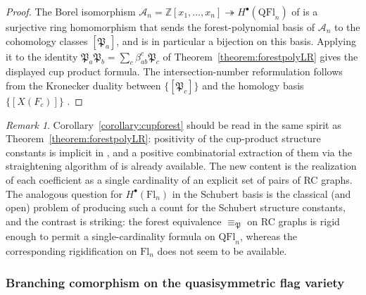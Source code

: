 \documentclass{amsart}
\theoremstyle{definition}
\theoremstyle{remark}
\newtheorem*{remark}{Remark}
\numberwithin{equation}{subsection}
\newcommand{\coma}{\mathcal{A}}
\newcommand{\forest}{\mathfrak{P}}
\begin{document}
\begin{proof}
The Borel isomorphism $\coma_n=\mathbb{Z}[x_1,\ldots,x_n]\twoheadrightarrow H^\bullet(\mathrm{QFl}_n)$ of \cite[Theorem~A and Corollary~12.5]{bergeron2025qsymflag} is a surjective ring homomorphism that sends the forest-polynomial basis of $\coma_n$ to the cohomology classes $[\forest_a]$, and is in particular a bijection on this basis. Applying it to the identity $\forest_a\forest_b = \sum_c \beta_{ab}^c \forest_c$ of Theorem~\ref{theorem:forestpolyLR} gives the displayed cup product formula. The intersection-number reformulation follows from the Kronecker duality between $\{[\forest_c]\}$ and the homology basis $\{[X(F_c)]\}$ \cite[Theorem~12.12]{bergeron2025qsymflag}.
\end{proof}

\begin{remark}
Corollary~\ref{corollary:cupforest} should be read in the same spirit as Theorem~\ref{theorem:forestpolyLR}: positivity of the cup-product structure constants is implicit in \cite{bergeron2025equivariant,bergeron2025qsymflag}, and a positive combinatorial extraction of them via the straightening algorithm of \cite{bergeron2025equivariant} is already available. The new content is the realization of each coefficient as a single cardinality of an explicit set of pairs of RC graphs. The analogous question for $H^\bullet(\mathrm{Fl}_n)$ in the Schubert basis is the classical (and open) problem of producing such a count for the Schubert structure constants, and the contrast is striking: the forest equivalence $\equiv_\forest$ on RC graphs is rigid enough to permit a single-cardinality formula on $\mathrm{QFl}_n$, whereas the corresponding rigidification on $\mathrm{Fl}_n$ does not seem to be available.
\end{remark}

\subsubsection*{Branching comorphism on the quasisymmetric flag variety}
\end{document}
